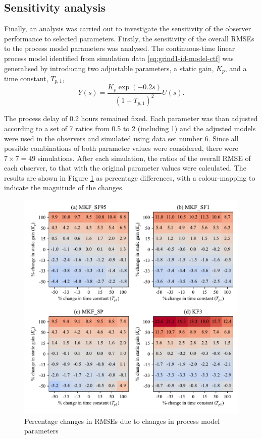 \subsection{Sensitivity analysis} \label{sec:grind1-sensitivity-analysis}
Finally, an analysis was carried out to investigate the sensitivity of the observer performance to selected parameters. Firstly, the sensitivity of the overall \gls{RMSE}s to the process model parameters was analysed. The continuous-time linear process model identified from simulation data \eqref{eq:grind1-id-model-ctf} was generalised by introducing two adjustable parameters, a static gain, $K_p$, and a time constant, $T_{p,1}$,
%
%
\begin{equation} \label{eq:grind1-sens-model-ctf}
	Y(s)= \frac{K_p \exp(-0.2s)}{(1 + T_{p,1})^2}U(s).
\end{equation}

The process delay of 0.2 hours remained fixed. Each parameter was than adjusted according to a set of 7 ratios from 0.5 to 2 (including 1) and the adjusted models were used in the observers and simulated using data set number 6. Since all possible combinations of both parameter values were considered, there were $7\times7=49$ simulations. After each simulation, the ratios of the overall \gls{RMSE} of each observer, to that with the original parameter values were calculated. The results are shown in Figure \ref{fig:grind1-obs-sim-sens-model-y-est} as percentage differences, with a colour-mapping to indicate the magnitude of the changes.
\begin{figure}[htp]
	\centering
	\includegraphics[width=15cm]{images/rod_obs_sim_sens_sys_4obs_RMSE_y_est.pdf}
	\caption{Percentage changes in \gls{RMSE}s due to changes in process model parameters}
	\label{fig:grind1-obs-sim-sens-model-y-est}
\end{figure}

